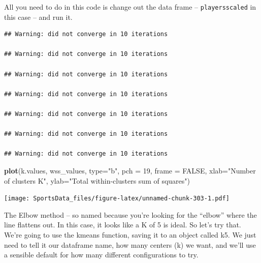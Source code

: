 \documentclass[
]{book}
\newenvironment{Shaded}{\begin{snugshade}}{\end{snugshade}}
\newcommand{\CommentTok}[1]{\textcolor[rgb]{0.56,0.35,0.01}{\textit{#1}}}
\newcommand{\ControlFlowTok}[1]{\textcolor[rgb]{0.13,0.29,0.53}{\textbf{#1}}}
\newcommand{\DataTypeTok}[1]{\textcolor[rgb]{0.13,0.29,0.53}{#1}}
\newcommand{\DecValTok}[1]{\textcolor[rgb]{0.00,0.00,0.81}{#1}}
\newcommand{\KeywordTok}[1]{\textcolor[rgb]{0.13,0.29,0.53}{\textbf{#1}}}
\newcommand{\NormalTok}[1]{#1}
\newcommand{\OperatorTok}[1]{\textcolor[rgb]{0.81,0.36,0.00}{\textbf{#1}}}
\newcommand{\OtherTok}[1]{\textcolor[rgb]{0.56,0.35,0.01}{#1}}
\newcommand{\StringTok}[1]{\textcolor[rgb]{0.31,0.60,0.02}{#1}}
\begin{document}
All you need to do in this code is change out the data frame -- \texttt{playersscaled} in this case -- and run it.

\begin{Shaded}
\end{Shaded}

\begin{verbatim}
## Warning: did not converge in 10 iterations

## Warning: did not converge in 10 iterations

## Warning: did not converge in 10 iterations

## Warning: did not converge in 10 iterations

## Warning: did not converge in 10 iterations

## Warning: did not converge in 10 iterations

## Warning: did not converge in 10 iterations
\end{verbatim}

\begin{Shaded}
\begin{Highlighting}[]
\KeywordTok{plot}\NormalTok{(k.values, wss_values,}
       \DataTypeTok{type=}\StringTok{"b"}\NormalTok{, }\DataTypeTok{pch =} \DecValTok{19}\NormalTok{, }\DataTypeTok{frame =} \OtherTok{FALSE}\NormalTok{, }
       \DataTypeTok{xlab=}\StringTok{"Number of clusters K"}\NormalTok{,}
       \DataTypeTok{ylab=}\StringTok{"Total within-clusters sum of squares"}\NormalTok{)}
\end{Highlighting}
\end{Shaded}

\texttt{[image: SportsData\_files/figure-latex/unnamed-chunk-303-1.pdf]}

The Elbow method -- so named because you're looking for the ``elbow'' where the line flattens out. In this case, it looks like a K of 5 is ideal. So let's try that. We're going to use the kmeans function, saving it to an object called k5. We just need to tell it our dataframe name, how many centers (k) we want, and we'll use a sensible default for how many different configurations to try.
\end{document}
